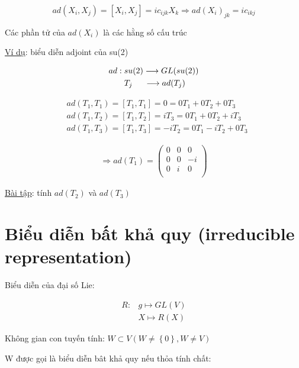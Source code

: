 \documentclass{report}
\begin{document}
\[ ad \left( X_{i}, X_{j} \right) = \left[ X_{i}, X_{j} \right] = i c_{ijk} X_{k} \Rightarrow ad \left( X_{i} \right)_{jk} = ic_{ikj} \]

Các phần tử của \( ad \left( X_{i} \right) \) là các hằng số cấu trúc

\underline{Ví dụ}: biểu diễn adjoint của su(2)

	\begin{align*}
		ad: \hspace*{1mm} & su(2) \longrightarrow GL(su(2)) \\
		& T_{j} \hspace*{0.5cm} \longrightarrow ad(T_{j})
	\end{align*}
	
	\begin{align*}
		& ad \left( T_{1}, T_{1} \right) = \left[ T_{1}, T_{1} \right] = 0 = 0T_{1} + 0T_{2} + 0T_{3} \\
		& ad \left( T_{1}, T_{2} \right) = \left[ T_{1}, T_{2} \right] = iT_{3} = 0T_{1} + 0T_{2} + iT_{3} \\
		& ad \left( T_{1}, T_{3} \right) = \left[ T_{1}, T_{3} \right] = -iT_{2} = 0T_{1} - iT_{2} + 0T_{3}
	\end{align*}
		
	\begin{align*}
		\Rightarrow ad(T_{1}) = \begin{pmatrix}
		0 & 0 & 0 \\
		0 & 0 & -i \\
		0 & i & 0 \\
	\end{pmatrix}			
	\end{align*}			
		
\underline{Bài tập}: tính \( ad(T_{2}) \) và \( ad(T_{3}) \)	
\section{Biểu diễn bất khả quy (irreducible representation)}

Biểu diễn của đại số Lie:

	\begin{align*}
		R: & g \longmapsto GL(V) \\
		& X \longmapsto R(X)
	\end{align*}
	
Không gian con tuyến tính: \( W \subset V ( W \neq \left\lbrace 0 \right\rbrace, W \neq V ) \)	

W được gọi là biểu diễn bât khả quy nếu thỏa tính chất:
\end{document}

